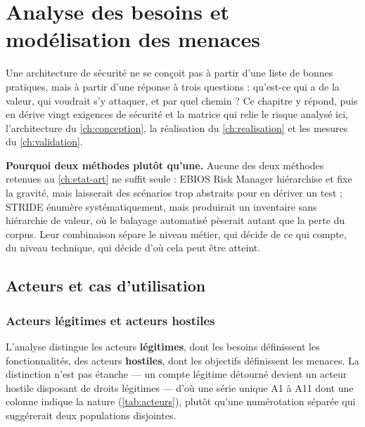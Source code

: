 \setlength{\textfloatsep}{10pt plus 2pt minus 3pt}
\setlength{\floatsep}{8pt plus 2pt minus 2pt}
\setlength{\intextsep}{8pt plus 2pt minus 2pt}
\setlength{\abovecaptionskip}{4pt}
\setlength{\belowcaptionskip}{2pt}
\setlength{\LTpre}{6pt}\setlength{\LTpost}{6pt}

\chapter{Analyse des besoins et modélisation des menaces}
\label{ch:besoins-menaces}

Une architecture de sécurité ne se conçoit pas à partir d'une liste de bonnes pratiques, mais à
partir d'une réponse à trois questions : qu'est-ce qui a de la valeur, qui voudrait s'y attaquer,
et par quel chemin ? Ce chapitre y répond, puis en dérive vingt exigences de sécurité et la matrice
qui relie le risque analysé ici, l'architecture du \cref{ch:conception}, la réalisation du \cref{ch:realisation} et les
mesures du \cref{ch:validation}.

\textbf{Pourquoi deux méthodes plutôt qu'une.} Aucune des deux méthodes retenues au \cref{ch:etat-art} ne
suffit seule : EBIOS Risk Manager hiérarchise et fixe la gravité, mais laisserait des scénarios
trop abstraits pour en dériver un test ; STRIDE énumère systématiquement, mais produirait un
inventaire sans hiérarchie de valeur, où le balayage automatisé pèserait autant que la perte du
corpus. Leur combinaison sépare le niveau métier, qui décide de ce qui compte, du niveau technique,
qui décide d'où cela peut être atteint.

\section{Acteurs et cas d'utilisation}

\subsection{Acteurs légitimes et acteurs hostiles}

L'analyse distingue les acteurs \textbf{légitimes}, dont les besoins définissent les
fonctionnalités, des acteurs \textbf{hostiles}, dont les objectifs définissent les menaces. La
distinction n'est pas étanche --- un compte légitime détourné devient un acteur hostile disposant
de droits légitimes --- d'où une série unique A1 à A11 dont une colonne indique la nature
(\cref{tab:acteurs}), plutôt qu'une numérotation séparée qui suggérerait deux populations
disjointes.

